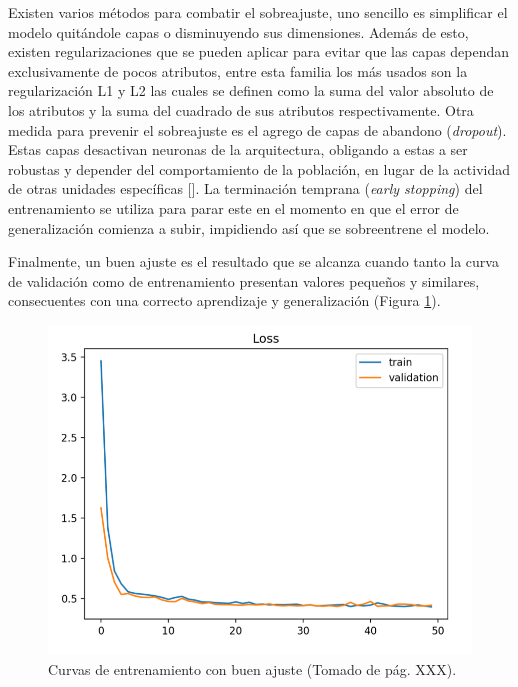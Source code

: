 Existen varios métodos para combatir el sobreajuste, uno sencillo es simplificar el modelo quitándole capas 
o disminuyendo sus dimensiones. Además de esto, existen regularizaciones que se pueden aplicar para evitar que 
las capas dependan exclusivamente de pocos atributos, entre esta familia los más usados son la regularización
L1 y L2 las cuales se definen como la suma del valor absoluto de los atributos y la suma del cuadrado de sus 
atributos respectivamente. Otra medida para prevenir el sobreajuste es el agrego de capas de abandono 
(\emph{dropout}). Estas capas desactivan neuronas de la arquitectura, obligando a 
estas a ser robustas y depender del comportamiento de la población, en lugar de la actividad de otras unidades 
específicas [\cite{baldi2013dropout}]. La terminación temprana (\emph{early stopping}) del entrenamiento
se utiliza para parar este en el momento en que el error de generalización comienza a subir, impidiendo así que 
se sobreentrene el modelo.

Finalmente, un buen ajuste es el resultado que se alcanza cuando tanto la curva de validación como de entrenamiento
presentan valores pequeños y similares, consecuentes con una correcto aprendizaje y generalización (Figura \ref{fig:good_fit}).

\begin{figure}[h!]
	\begin{center}
		\begin{center}
			\includegraphics[scale=.3]{Graphics/good_fit.png}
        \end{center}
	    \caption{Curvas de entrenamiento con buen ajuste (Tomado de \textcite{brownlee2018better} pág. XXX).}\label{fig:good_fit}
	\end{center}
\end{figure}

